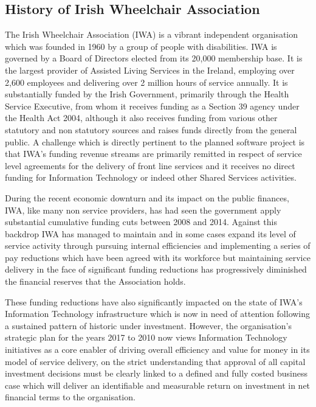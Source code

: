 \documentclass[a4paper,12pt]{article}
\begin{document}
\begin{samepage}
\subsection {History of Irish Wheelchair Association}
The Irish Wheelchair Association (IWA) is a vibrant  independent organisation which was founded in 1960 by a group of people with disabilities. IWA is governed by a Board of Directors elected from its 20,000 membership base. It is the largest provider of Assisted Living Services in the Ireland, employing over 2,600 employees and delivering over 2 million hours of service annually. It is substantially funded by the Irish Government, primarily through the Health Service Executive, from whom it receives funding as a Section 39 agency under the Health Act 2004, although it also receives funding from various other statutory and non statutory sources and raises funds directly from the general public. A challenge which is directly pertinent to the planned software project is that IWA's funding revenue streams are primarily remitted in respect of service level agreements for the delivery of front line services and it receives no direct funding for Information Technology or indeed other Shared Services activities.

During the recent economic downturn and its impact on the public finances, IWA, like many non service providers, has had seen the government apply substantial cumulative funding cuts between 2008 and 2014. Against this backdrop IWA has managed to maintain and in some cases expand its level of service activity through pursuing internal efficiencies and implementing a series of pay reductions which have been agreed with its workforce but maintaining service delivery in the face of significant funding reductions has progressively diminished the financial reserves that the Association holds. 

These funding reductions have also significantly impacted on the state of IWA's Information Technology infrastructure which is now in need of attention following a sustained pattern of historic under investment. However, the organisation's strategic plan for the years 2017 to 2010 now views Information Technology initiatives as a core enabler of driving overall efficiency and value for money in its model of service delivery, on the strict understanding that approval of all capital investment decisions must be clearly linked to a defined and fully costed business case which will deliver an identifiable and measurable return on investment in net financial terms to the organisation. 


\end{samepage}
\end{document}
